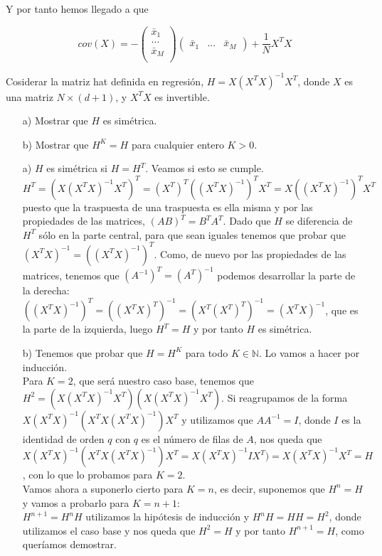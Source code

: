 \documentclass[12pt]{article}
\theoremstyle{definition}
\begin{document}
\begin{pregunta}
Y por tanto hemos llegado a que

\[
	cov(X) = - \left( \begin{array}{c}
		\bar{x}_1 \\
		... \\
		\bar{x}_M \\ \end{array} \right)
		\left( \begin{array}{ccc}
		\bar{x}_1 & ... & \bar{x}_M  \end{array} \right) + \frac{1}{N}X^TX
\]

\end{pregunta}

\begin{pregunta}
Cosiderar la matriz hat definida en regresión, $H=X(X^TX)^{-1}X^T$, donde $X$ es una matriz $N \times (d+1)$, y $X^TX$ es invertible.
\begin{enumerate}
\item[a)] Mostrar que $H$ es simétrica.
\item[b)] Mostrar que $H^K=H$ para cualquier entero $K>0$.
\end{enumerate}

\begin{enumerate}
\item[a)] $H$ es simétrica si $H=H^T$. Veamos si esto se cumple. $H^T=(X(X^TX)^{-1}X^T)^T=(X^T)^T((X^TX)^{-1})^TX^T=X((X^TX)^{-1})^TX^T$ puesto que la traspuesta de una traspuesta es ella misma y por las propiedades de las matrices, $(AB)^T=B^TA^T$. Dado que $H$ se diferencia de $H^T$ sólo en la parte central, para que sean iguales tenemos que probar que $(X^TX)^{-1} = ((X^TX)^{-1})^T$. Como, de nuevo por las propiedades de las matrices, tenemos que $(A^{-1})^T = (A^T)^{-1}$ podemos desarrollar la parte de la derecha: $((X^TX)^{-1})^T = ((X^TX)^T)^{-1} = (X^T(X^T)^T)^{-1} = (X^TX)^{-1}$, que es la parte de la izquierda, luego $H^T=H$ y por tanto $H$ es simétrica.
\item[b)] Tenemos que probar que $H=H^K$ para todo $K \in \mathbb{N}$. Lo vamos a hacer por inducción.\\
Para $K=2$, que será nuestro caso base, tenemos que $H^2 = (X(X^TX)^{-1}X^T)(X(X^TX)^{-1}X^T)$. Si reagrupamos de la forma $X(X^TX)^{-1}(X^TX(X^TX)^{-1})X^T$ y utilizamos que $AA^{-1}=I$, donde $I$ es la identidad de orden $q$ con $q$ es el número de filas de $A$, nos queda que $X(X^TX)^{-1}(X^TX(X^TX)^{-1})X^T = X(X^TX)^{-1}IX^T) = X(X^TX)^{-1}X^T = H$, con lo que lo probamos para $K=2$.\\
Vamos ahora a suponerlo cierto para $K=n$, es decir, suponemos que $H^n=H$ y vamos a probarlo para $K=n+1$:\\
$H^{n+1} = H^nH$ utilizamos la hipótesis de inducción y $H^nH=HH=H^2$, donde utilizamos el caso base y nos queda que $H^2=H$ y por tanto $H^{n+1}=H$, como queríamos demostrar.
\end{enumerate}

\end{pregunta}
\end{document}
